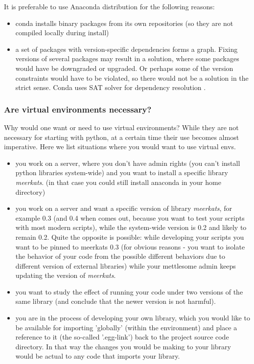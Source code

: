\documentclass[article]{revtex4}
\begin{document}
It is preferable to use Anaconda distribution for the following reasons:
\begin{itemize}
    \item conda installs binary packages from its own repositories (so they are not compiled locally during install)
    \item a set of packages with version-specific dependencies forms a graph. Fixing versions of several packages may result in a solution, where some packages would have be downgraded or upgraded. Or perhaps some of the version constraints would have to be violated, so there would not be a solution in the strict sense. Conda uses SAT solver for dependency resolution \cite{satsolver}.
\end{itemize}

\subsubsection{Are virtual environments necessary?}
Why would one want or need to use virtual environments? While they are not necessary for starting with python, at a certain time their use becomes almost imperative. Here we list situations where you would want to use virtual envs.

\begin{itemize}
    \item you work on a server, where you don't have admin rights (you can't install python libraries system-wide) and you want to install a specific library {\it meerkats}. (in that case you could still install anaconda in your home directory)

    \item you work on a server and want a specific version of library {\it meerkats}, for example 0.3 (and 0.4 when comes out, because you want to test your scripts with most modern scripts), while the system-wide version is 0.2 and likely to remain 0.2. Quite the opposite is possible: while developing your scripts you want to be pinned to meerkats 0.3 (for obvious reasons - you want to isolate the behavior of your code from the possible different behaviors due to different version of external libraries) while your mettlesome admin keeps updating the version of {\it meerkats}.

    \item you want to study the effect of running your code under two versions of the same library (and conclude that the newer version is not harmful).

    \item you are in the process of developing your own library, which you would like to be available for importing 'globally' (within the environment) and place a reference to it (the so-called '.egg-link') back to the project source code directory. In that way the changes you would be making to your library would be actual to any code that imports your library.
\end{itemize}
\end{document}
